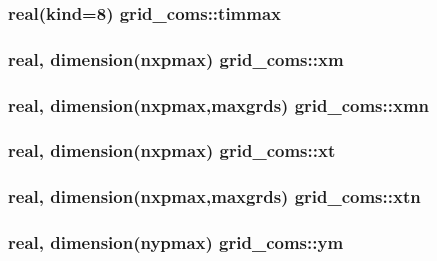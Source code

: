 \subsubsection[{\texorpdfstring{timmax}{timmax}}]{\setlength{\rightskip}{0pt plus 5cm}real(kind=8) grid\+\_\+coms\+::timmax}\hypertarget{namespacegrid__coms_a0d5d3c6d496f754a977e81e980b57006}{}\label{namespacegrid__coms_a0d5d3c6d496f754a977e81e980b57006}
\subsubsection[{\texorpdfstring{xm}{xm}}]{\setlength{\rightskip}{0pt plus 5cm}real, dimension(nxpmax) grid\+\_\+coms\+::xm}\hypertarget{namespacegrid__coms_afa5dc0abd71433f8c1e1e42ed0f3f485}{}\label{namespacegrid__coms_afa5dc0abd71433f8c1e1e42ed0f3f485}
\subsubsection[{\texorpdfstring{xmn}{xmn}}]{\setlength{\rightskip}{0pt plus 5cm}real, dimension(nxpmax,maxgrds) grid\+\_\+coms\+::xmn}\hypertarget{namespacegrid__coms_aedf16bdd9f6805d93904a372e5f5ac32}{}\label{namespacegrid__coms_aedf16bdd9f6805d93904a372e5f5ac32}
\subsubsection[{\texorpdfstring{xt}{xt}}]{\setlength{\rightskip}{0pt plus 5cm}real, dimension(nxpmax) grid\+\_\+coms\+::xt}\hypertarget{namespacegrid__coms_ab408e5eee5cb44c67ad1321c400c71ec}{}\label{namespacegrid__coms_ab408e5eee5cb44c67ad1321c400c71ec}
\subsubsection[{\texorpdfstring{xtn}{xtn}}]{\setlength{\rightskip}{0pt plus 5cm}real, dimension(nxpmax,maxgrds) grid\+\_\+coms\+::xtn}\hypertarget{namespacegrid__coms_ac434d86587ed3416352d2ee40a8a542f}{}\label{namespacegrid__coms_ac434d86587ed3416352d2ee40a8a542f}
\subsubsection[{\texorpdfstring{ym}{ym}}]{\setlength{\rightskip}{0pt plus 5cm}real, dimension(nypmax) grid\+\_\+coms\+::ym}\hypertarget{namespacegrid__coms_a4e0c01da9f5b650af168d526fc6161e6}{}\label{namespacegrid__coms_a4e0c01da9f5b650af168d526fc6161e6}

